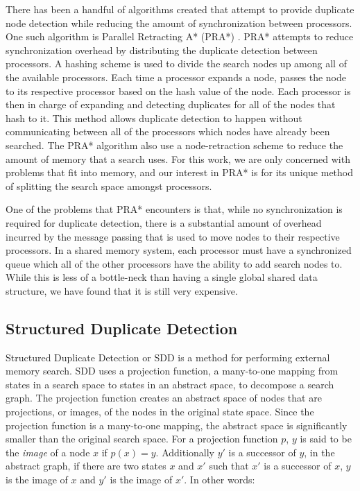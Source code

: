 \documentclass{article}
\begin{document}
There has been a handful of algorithms created that attempt to provide
duplicate node detection while reducing the amount of synchronization
between processors.  One such algorithm is Parallel Retracting A*
(PRA*) \cite{evett:pra}.  PRA* attempts to reduce synchronization
overhead by distributing the duplicate detection between processors.
A hashing scheme is used to divide the search nodes up among all of
the available processors.  Each time a processor expands a node,
passes the node to its respective processor based on the hash value of
the node.  Each processor is then in charge of expanding and detecting
duplicates for all of the nodes that hash to it.  This method allows
duplicate detection to happen without communicating between all of the
processors which nodes have already been searched.  The PRA* algorithm
also use a node-retraction scheme to reduce the amount of memory that
a search uses.  For this work, we are only concerned with problems
that fit into memory, and our interest in PRA* is for its unique
method of splitting the search space amongst processors.

One of the problems that PRA* encounters is that, while no
synchronization is required for duplicate detection, there is a
substantial amount of overhead incurred by the message passing that is
used to move nodes to their respective processors.  In a shared memory
system, each processor must have a synchronized queue which all of the
other processors have the ability to add search nodes to.  While this
is less of a bottle-neck than having a single global shared data
structure, we have found that it is still very expensive.

\subsection{Structured Duplicate Detection}

Structured Duplicate Detection or SDD \cite{zhou:sdd} is a method for
performing external memory search.  SDD uses a projection function, a
many-to-one mapping from states in a search space to states in an
abstract space, to decompose a search graph.  The projection function
creates an abstract space of nodes that are projections, or images, of
the nodes in the original state space.  Since the projection function
is a many-to-one mapping, the abstract space is significantly smaller
than the original search space.  For a projection function $p$, $y$ is
said to be the \emph{image} of a node $x$ if $p(x) = y$.  Additionally
$y'$ is a successor of $y$, in the abstract graph, if there are two
states $x$ and $x'$ such that $x'$ is a successor of $x$, $y$ is the
image of $x$ and $y'$ is the image of $x'$.  In other words:
\end{document}
